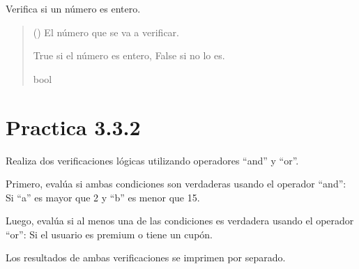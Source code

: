 \documentclass[letterpaper,10pt,spanish]{sphinxmanual}
\begin{document}
\begin{fulllineitems}
\label{\detokenize{pr3:pr3.3_1.es_entero}}
\pysigstartsignatures
{}
\pysigstopsignatures
\sphinxAtStartPar
Verifica si un número es entero.
\begin{quote}\begin{description}
\sphinxAtStartPar
{} () \textendash{} El número que se va a verificar.

\sphinxAtStartPar
True si el número es entero, False si no lo es.

\sphinxAtStartPar
bool

\end{description}\end{quote}

\end{fulllineitems}



\section{Practica 3.3.2}
\label{\detokenize{pr3:module-pr3.3_2}}\label{\detokenize{pr3:practica-3-3-2}}

\begin{fulllineitems}
\label{\detokenize{pr3:pr3.3_2.verificar_condiciones_logicas}}
\pysigstartsignatures
{}
\pysigstopsignatures
\sphinxAtStartPar
Realiza dos verificaciones lógicas utilizando operadores “and” y “or”.

\sphinxAtStartPar
Primero, evalúa si ambas condiciones son verdaderas usando el operador “and”:
\sphinxhyphen{} Si “a” es mayor que 2 y “b” es menor que 15.

\sphinxAtStartPar
Luego, evalúa si al menos una de las condiciones es verdadera usando el operador “or”:
\sphinxhyphen{} Si el usuario es premium o tiene un cupón.

\sphinxAtStartPar
Los resultados de ambas verificaciones se imprimen por separado.

\end{fulllineitems}
\end{document}
